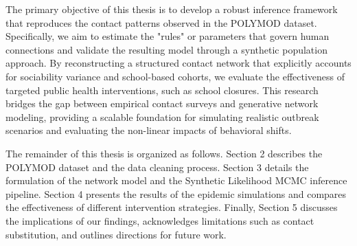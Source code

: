 The primary objective of this thesis is to develop a robust inference framework that reproduces the contact patterns observed in the POLYMOD dataset.
Specifically, we aim to estimate the "rules" or parameters that govern human connections and validate the resulting model through a synthetic population approach.
By reconstructing a structured contact network that explicitly accounts for sociability variance and school-based cohorts, we evaluate the effectiveness of targeted public health interventions, such as school closures.
This research bridges the gap between empirical contact surveys and generative network modeling, providing a scalable foundation for simulating realistic outbreak scenarios and evaluating the non-linear impacts of behavioral shifts.

The remainder of this thesis is organized as follows.
Section 2 describes the POLYMOD dataset and the data cleaning process.
Section 3 details the formulation of the network model and the Synthetic Likelihood MCMC inference pipeline.
Section 4 presents the results of the epidemic simulations and compares the effectiveness of different intervention strategies.
Finally, Section 5 discusses the implications of our findings, acknowledges limitations such as contact substitution, and outlines directions for future work.